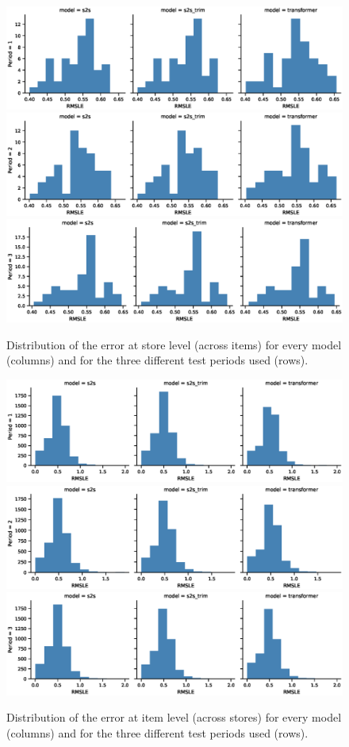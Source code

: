 \documentclass{elsarticle}
\begin{document}
	
	    \begin{figure}[h!]
		\centering
		\includegraphics[width=0.7\linewidth]{img/rmsle_storewise_lag3}
		\includegraphics[width=0.7\linewidth]{img/rmsle_storewise_lag2}
		\includegraphics[width=0.7\linewidth]{img/rmsle_storewise_lag1}
		\caption{Distribution of the error at store level (across items) for every model (columns) and for the three different test periods used (rows).}
		\label{fig:stores_performance}
	\end{figure}


	\begin{figure}[h!]
		\centering
		\includegraphics[width=0.7\linewidth]{img/rmsle_itemwise_lag3}
		\includegraphics[width=0.7\linewidth]{img/rmsle_itemwise_lag2}
		\includegraphics[width=0.7\linewidth]{img/rmsle_itemwise_lag1}
		\caption{Distribution of the error at item level (across stores) for every model (columns) and for the three different test periods used (rows).}
		\label{fig:items_performance}
	\end{figure}
	
\end{document}

